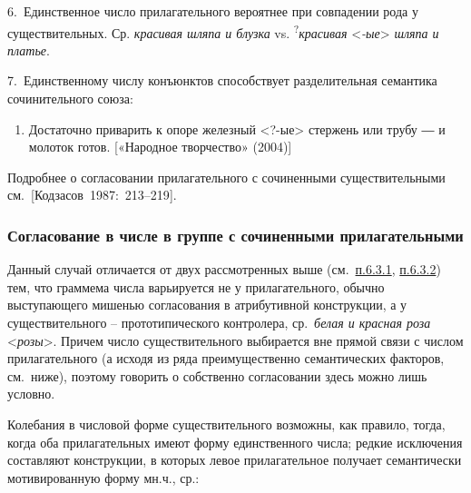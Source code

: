 6.~Единственное число прилагательного вероятнее при совпадении рода у
существительных. Ср. \emph{красивая шляпа и блузка} vs.
\textsuperscript{?}\emph{красивая} \textless{}\emph{-ые}\textgreater{}
\emph{шляпа и платье}.

7.~Единственному числу конъюнктов способствует разделительная семантика
сочинительного союза:

\begin{enumerate}
\def\labelenumi{(\arabic{enumi})}
\setcounter{enumi}{141}
\item
  Достаточно приварить к опоре железный \textless?-ые\textgreater{}
  стержень или трубу ― и молоток готов. {[}«Народное творчество»
  (2004){]}
\end{enumerate}

Подробнее о согласовании прилагательного с сочиненными существительными
см.~{[}Кодзасов~1987:~213--219{]}.

\hypertarget{ux441ux43eux433ux43bux430ux441ux43eux432ux430ux43dux438ux435-ux432-ux447ux438ux441ux43bux435-ux432-ux433ux440ux443ux43fux43fux435-ux441-ux441ux43eux447ux438ux43dux435ux43dux43dux44bux43cux438-ux43fux440ux438ux43bux430ux433ux430ux442ux435ux43bux44cux43dux44bux43cux438}{%
\subsubsection{Согласование в числе в группе с сочиненными
прилагательными}\label{ux441ux43eux433ux43bux430ux441ux43eux432ux430ux43dux438ux435-ux432-ux447ux438ux441ux43bux435-ux432-ux433ux440ux443ux43fux43fux435-ux441-ux441ux43eux447ux438ux43dux435ux43dux43dux44bux43cux438-ux43fux440ux438ux43bux430ux433ux430ux442ux435ux43bux44cux43dux44bux43cux438}}

Данный случай отличается от двух рассмотренных выше
(см.~\underline{п.6.3.1}, \underline{п.6.3.2}) тем, что граммема числа
варьируется не у прилагательного, обычно выступающего мишенью
согласования в атрибутивной конструкции, а у существительного --
прототипического контролера, ср.~\emph{белая и красная роза}
\textless{}\emph{розы}\textgreater. Причем число существительного
выбирается вне прямой связи с числом прилагательного (а исходя из ряда
преимущественно семантических факторов, см.~ниже), поэтому говорить о
собственно согласовании здесь можно лишь условно.

Колебания в числовой форме существительного возможны, как правило,
тогда, когда оба прилагательных имеют форму единственного числа; редкие
исключения составляют конструкции, в которых левое прилагательное
получает семантически мотивированную форму мн.ч., ср.:

